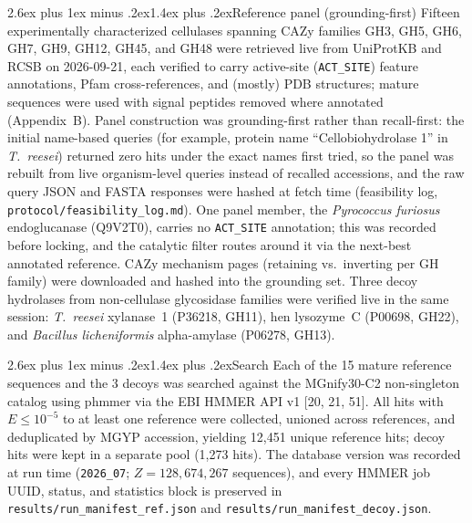 \documentclass[11pt]{article}
\makeatletter
\renewcommand{\subsection}{\@startsection{subsection}{2}{\z@}%
  {2.6ex plus 1ex minus .2ex}{1.4ex plus .2ex}{\large\bfseries\color{navy}}}
\makeatother
\begin{document}
\subsection{Reference panel (grounding-first)}
Fifteen experimentally characterized cellulases spanning CAZy families GH3, GH5, GH6, GH7, GH9, GH12, GH45, and GH48 were retrieved live from UniProtKB and RCSB on 2026-09-21, each verified to carry active-site (\texttt{ACT\_SITE}) feature annotations, Pfam cross-references, and (mostly) PDB structures; mature sequences were used with signal peptides removed where annotated (Appendix~B). Panel construction was grounding-first rather than recall-first: the initial name-based queries (for example, protein name ``Cellobiohydrolase 1'' in \textit{T.\ reesei}) returned zero hits under the exact names first tried, so the panel was rebuilt from live organism-level queries instead of recalled accessions, and the raw query JSON and FASTA responses were hashed at fetch time (feasibility log, \texttt{protocol/feasibility\_log.md}). One panel member, the \textit{Pyrococcus furiosus} endoglucanase (Q9V2T0), carries no \texttt{ACT\_SITE} annotation; this was recorded before locking, and the catalytic filter routes around it via the next-best annotated reference. CAZy mechanism pages (retaining vs.\ inverting per GH family) were downloaded and hashed into the grounding set. Three decoy hydrolases from non-cellulase glycosidase families were verified live in the same session: \textit{T.\ reesei} xylanase~1 (P36218, GH11), hen lysozyme~C (P00698, GH22), and \textit{Bacillus licheniformis} alpha-amylase (P06278, GH13).

\subsection{Search}
Each of the 15 mature reference sequences and the 3 decoys was searched against the MGnify30-C2 non-singleton catalog using phmmer via the EBI HMMER API v1 [20, 21, 51]. All hits with $E \le 10^{-5}$ to at least one reference were collected, unioned across references, and deduplicated by MGYP accession, yielding 12,451 unique reference hits; decoy hits were kept in a separate pool (1,273 hits). The database version was recorded at run time (\texttt{2026\_07}; $Z = 128{,}674{,}267$ sequences), and every HMMER job UUID, status, and statistics block is preserved in \texttt{results/run\_manifest\_ref.json} and \texttt{results/run\_manifest\_decoy.json}.
\end{document}
